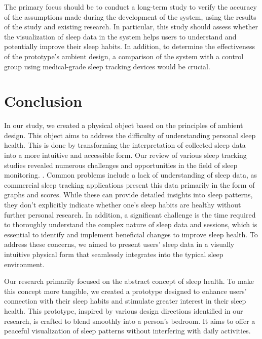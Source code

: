 \documentclass[
  a4paper,  %
  twoside,  %
  bibliography=totoc,
  headsepline,
  cleardoublepage=empty,
  parskip=half,
  draft=false
]{scrbook}
\begin{document}
The primary focus should be to conduct a long-term study to verify the accuracy of the assumptions made during the development of the system, using the results of the study and existing research. In particular, this study should assess whether the visualization of sleep data in the system helps users to understand and potentially improve their sleep habits. In addition, to determine the effectiveness of the prototype's ambient design, a comparison of the system with a control group using medical-grade sleep tracking devices would be crucial.


\chapter{Conclusion}
In our study, we created a physical object based on the principles of ambient design. This object aims to address the difficulty of understanding personal sleep health. This is done by transforming the interpretation of collected sleep data into a more intuitive and accessible form. Our review of various sleep tracking studies revealed numerous challenges and opportunities in the field of sleep monitoring. \cite{Challenges_Oppotunieties_SleepTracking}. Common problems include a lack of understanding of sleep data, as commercial sleep tracking applications present this data primarily in the form of graphs and scores. While these can provide detailed insights into sleep patterns, they don't explicitly indicate whether one's sleep habits are healthy without further personal research. In addition, a significant challenge is the time required to thoroughly understand the complex nature of sleep data and sessions, which is essential to identify and implement beneficial changes to improve sleep health. To address these concerns, we aimed to present users' sleep data in a visually intuitive physical form that seamlessly integrates into the typical sleep environment.

Our research primarily focused on the abstract concept of sleep health. To make this concept more tangible, we created a prototype designed to enhance users' connection with their sleep habits and stimulate greater interest in their sleep health. This prototype, inspired by various design directions identified in our research, is crafted to blend smoothly into a person's bedroom. It aims to offer a peaceful visualization of sleep patterns without interfering with daily activities.
\end{document}
